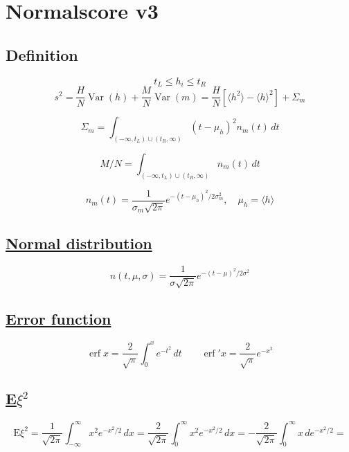 \documentclass[12pt]{article}
\begin{document}
\section*{Normalscore v3}

\subsection*{Definition}

\[ t_L \leq h_i \leq t_R \]
\[
s^2 =
\frac{H}{N} \operatorname{Var} (h) + \frac{M}{N} \operatorname{Var} (m) =
\frac{H}{N} \left[
    \langle h^2 \rangle - \langle h \rangle^2
\right] + \Sigma_m
\]

\begin{equation}
\Sigma_m = \int_{(-\infty, t_L) \cup (t_R, \infty)} \left( t - \mu_h \right)^2 n_m(t) \,dt
\label{eq:def_Sigma_m}
\end{equation}

\[
M / N = \int_{(-\infty, t_L) \cup (t_R, \infty)} n_m(t) \,dt
\]

\[
n_m(t) = \frac{1}{\sigma_m\sqrt{2 \pi }} e^{-(t - \mu_h)^2/2\sigma_m^2}, \quad \mu_h = \langle h \rangle
\]

\subsection*{\href{https://en.wikipedia.org/wiki/Normal_distribution}{Normal distribution}}

\[
n(t, \mu, \sigma) = \frac{1}{\sigma\sqrt{2 \pi }} e^{-(t - \mu)^2/2\sigma^2}
\]

\subsection*{\href{https://en.wikipedia.org/wiki/Error_function}{Error function}}

\[
\operatorname{erf} x = \frac{2}{\sqrt{\pi}} \int_{0}^{x} e^{-t^2} \,dt
\quad\quad
\operatorname{erf}'x = \frac{2}{\sqrt{\pi}} e^{-x^{2}}
\]

\subsection*{\href{https://tvims.nsu.ru/chernova/tv/lec/node46.html}{E\(\xi^2\)}}

\[
\text{E}\xi^2 = \frac{1}{\sqrt{2\pi}} \int_{-\infty}^{\infty} x^2 e^{-x^2/2} \,dx =
\frac{2}{\sqrt{2\pi}} \int_{0}^{\infty} x^2 e^{-x^2/2} \,dx =
-\frac{2}{\sqrt{2\pi}} \int_{0}^{\infty} x \,de^{-x^2/2} =
\]
\end{document}
